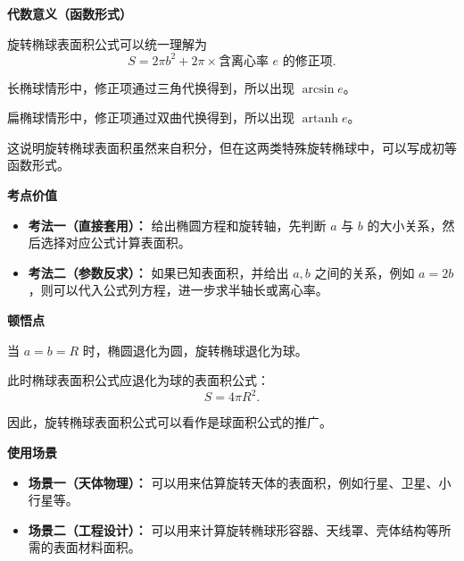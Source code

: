 \begin{explanationbox}
	\medskip

	\textbf{\textcolor{CExplanation}{代数意义（函数形式）}}

	旋转椭球表面积公式可以统一理解为
	\[
		S
		=
		2\pi b^{2}
		+
		2\pi\times \text{含离心率 } e \text{ 的修正项}.
	\]

	长椭球情形中，修正项通过三角代换得到，所以出现 $\arcsin e$。

	扁椭球情形中，修正项通过双曲代换得到，所以出现 $\operatorname{artanh} e$。

	这说明旋转椭球表面积虽然来自积分，但在这两类特殊旋转椭球中，可以写成初等函数形式。

	\medskip

	\textbf{\textcolor{CExplanation}{考点价值}}

	\begin{itemize}[leftmargin=*, itemsep=0.5em, topsep=0.4em]
		\item \textbf{考法一（直接套用）：}
		      给出椭圆方程和旋转轴，先判断 $a$ 与 $b$ 的大小关系，然后选择对应公式计算表面积。

		\item \textbf{考法二（参数反求）：}
		      如果已知表面积，并给出 $a,b$ 之间的关系，例如 $a=2b$，则可以代入公式列方程，进一步求半轴长或离心率。
	\end{itemize}

	\medskip

	\textbf{\textcolor{CExplanation}{顿悟点}}

	当 $a=b=R$ 时，椭圆退化为圆，旋转椭球退化为球。

	此时椭球表面积公式应退化为球的表面积公式：
	\[
		S=4\pi R^{2}.
	\]

	因此，旋转椭球表面积公式可以看作是球面积公式的推广。

	\medskip

	\textbf{\textcolor{CExplanation}{使用场景}}

	\begin{itemize}[leftmargin=*, itemsep=0.5em, topsep=0.4em]
		\item \textbf{场景一（天体物理）：}
		      可以用来估算旋转天体的表面积，例如行星、卫星、小行星等。

		\item \textbf{场景二（工程设计）：}
		      可以用来计算旋转椭球形容器、天线罩、壳体结构等所需的表面材料面积。
	\end{itemize}

\end{explanationbox}